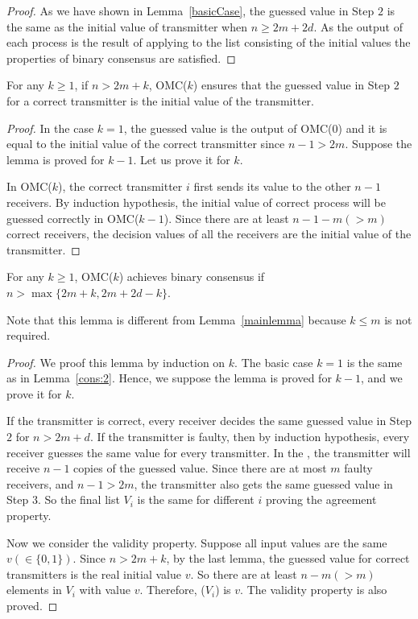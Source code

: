 \begin{proof}
As we have shown in Lemma~\ref{basicCase}, the guessed value in Step $2$ 
is the same as the initial value of transmitter when $n \geqslant 2m+2d$. 
As the output of each process is the result of applying  to the list consisting of the initial values the properties of binary  consensus are satisfied.
\end{proof}

\begin{lemma}
For any $k\geqslant 1$, if $n>2m+k$, OMC($k$) ensures that the guessed value in Step $2$ for a correct transmitter is the initial value of the transmitter.
\end{lemma}

\begin{proof}
In the case $k=1$, the guessed value is the output of OMC(0) and  it is equal to the initial value of the correct transmitter since $n-1>2m$. Suppose the lemma is proved for $k-1$. Let us prove it for $k$.

In OMC($k$), the correct transmitter $i$ first sends its value to the other $n-1$ receivers. 
By induction hypothesis, the initial value of correct process will be guessed  correctly in OMC($k-1$). 
Since there are at least $n-1-m(>m)$ correct receivers, the decision values of all the receivers are the initial value of the transmitter.
\end{proof}

\begin{lemma}\label{cons:corelemma}
  For any $k \geqslant 1$, OMC($k$) achieves binary consensus if $n>\max\{2m+k,2m+2d-k\}$.
\end{lemma}

Note that this lemma is different from Lemma~\ref{mainlemma} because $k\leqslant m$ is not required.

\begin{proof}
We proof this lemma by induction on $k$. The basic case $k=1$ is the same as in Lemma~\ref{cons:2}.
Hence, we suppose the lemma is proved for $k-1$, and we prove it for $k$.

If the transmitter is correct, every receiver decides the same guessed value in Step $2$ for $n>2m+d$. 
If the transmitter is faulty, then
by induction hypothesis, every receiver  guesses the same value for every transmitter. 
In the , the transmitter will receive $n-1$ copies of the guessed value. 
Since there are at most $m$ faulty receivers, and $n-1>2m$, the transmitter 
also gets the same guessed value in Step $3$. 
So the final list $V_i$ is the same for different $i$ proving the agreement property. 

Now we consider  the validity property.
Suppose all input values are the same $v(\in \{0,1\})$. 
Since $n>2m+k$, by the last lemma, the guessed value for correct transmitters is the real initial value $v$. So there are at least $n-m (> m)$ elements in $V_i$ with value $v$. Therefore, ($V_i$) is $v$. 
The validity property is also proved.
\end{proof}

